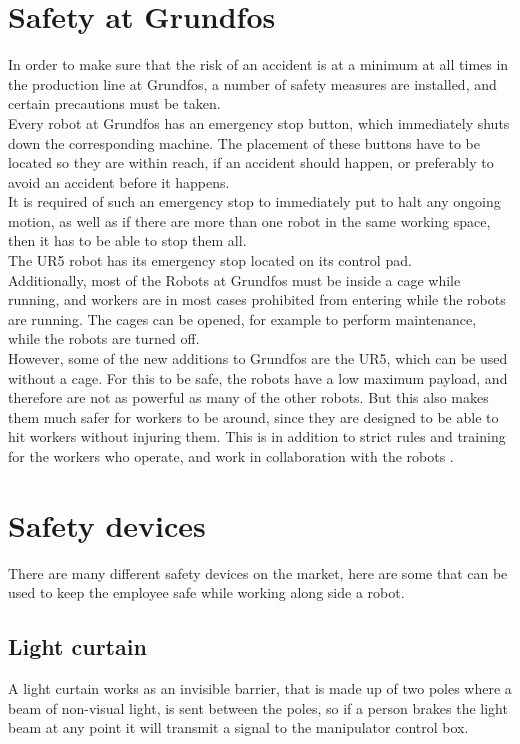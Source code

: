 \section{Safety at Grundfos}\label{ch:Safety at Grundfos}
In order to make sure that the risk of an accident is at a minimum at all times in the production line at Grundfos, a number of safety measures are installed, and certain precautions must be taken.\\

Every robot at Grundfos has an emergency stop button, which immediately shuts down the corresponding machine. The placement of these buttons have to be located so they are within reach, if an accident should happen, or preferably to avoid an accident before it happens. \\
It is required of such an emergency stop to immediately put to halt any ongoing motion, as well as if there are more than one robot in the same working space, then it has to be able to stop them all.\\
The UR5 robot has its emergency stop located on its control pad.\\

Additionally, most of the Robots at Grundfos must be inside a cage while running, and workers are in most cases prohibited from entering while the robots are running. The cages can be opened, for example to perform maintenance, while the robots are turned off.\\

However, some of the new additions to Grundfos are the UR5, which can be used without a cage. For this to be safe, the robots have a low maximum payload, and therefore are not as powerful as many of the other robots. But this also makes them much safer for workers to be around, since they are designed to be able to hit workers without injuring them. This is in addition to strict rules and training for the workers who operate, and work in collaboration with the robots \cite{Safety at Grundfos}. \\

\section{Safety devices}\label{SafetyDevices}
There are many different safety devices  on the market, here are some that can be used to keep the employee safe while working along side a robot.\\

\subsection{Light curtain}
A light curtain works as an invisible barrier, that is made up of two poles where a beam of non-visual light, is sent between the poles, so if a person brakes the light beam at any point it will transmit a signal to the manipulator control box\cite{ligthcurtian}.\\

